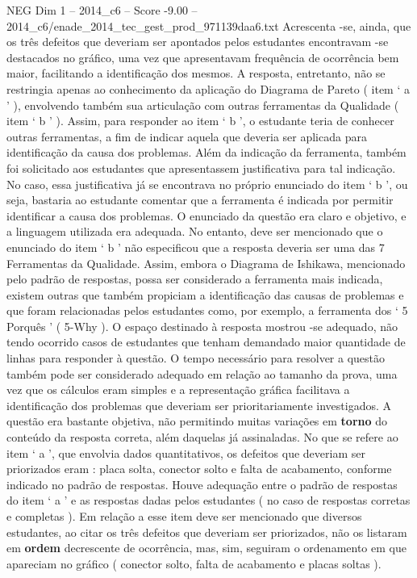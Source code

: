 \begin{textsample}{NEG Dim 1 – 2014\_c6 – Score -9.00 – 2014\_c6/enade\_2014\_tec\_gest\_prod\_971139daa6.txt}
Acrescenta -se, ainda, que os três defeitos que deveriam ser apontados pelos estudantes encontravam -se destacados no gráfico, uma vez que apresentavam frequência de ocorrência bem maior, facilitando a identificação dos mesmos.
A resposta, entretanto, não se restringia apenas ao conhecimento da aplicação do Diagrama de Pareto ( item ‘ a ’ ), envolvendo também sua articulação com outras ferramentas da Qualidade ( item ‘ b ’ ).
Assim, para responder ao item ‘ b ’, o estudante teria de conhecer outras ferramentas, a fim de indicar aquela que deveria ser aplicada para identificação da causa dos problemas.
Além da indicação da ferramenta, também foi solicitado aos estudantes que apresentassem justificativa para tal indicação.
No caso, essa justificativa já se encontrava no próprio enunciado do item ‘ b ’, ou seja, bastaria ao estudante comentar que a ferramenta é indicada por permitir identificar a causa dos problemas.
O enunciado da questão era claro e objetivo, e a linguagem utilizada era adequada.
No entanto, deve ser mencionado que o enunciado do item ‘ b ’ não especificou que a resposta deveria ser uma das 7 Ferramentas da Qualidade.
Assim, embora o Diagrama de Ishikawa, mencionado pelo padrão de respostas, possa ser considerado a ferramenta mais indicada, existem outras que também propiciam a identificação das causas de problemas e que foram relacionadas pelos estudantes como, por exemplo, a ferramenta dos ‘ 5 Porquês ’ ( 5-Why ).
O espaço destinado à resposta mostrou -se adequado, não tendo ocorrido casos de estudantes que tenham demandado maior quantidade de linhas para responder à questão.
O tempo necessário para resolver a questão também pode ser considerado adequado em relação ao tamanho da prova, uma vez que os cálculos eram simples e a representação gráfica facilitava a identificação dos problemas que deveriam ser prioritariamente investigados.
A questão era bastante objetiva, não permitindo muitas variações em \textbf{torno} do conteúdo da resposta correta, além daquelas já assinaladas.
No que se refere ao item ‘ a ’, que envolvia dados quantitativos, os defeitos que deveriam ser priorizados eram : placa solta, conector solto e falta de acabamento, conforme indicado no padrão de respostas.
Houve adequação entre o padrão de respostas do item ‘ a ’ e as respostas dadas pelos estudantes ( no caso de respostas corretas e completas ).
Em relação a esse item deve ser mencionado que diversos estudantes, ao citar os três defeitos que deveriam ser priorizados, não os listaram em \textbf{ordem} decrescente de ocorrência, mas, sim, seguiram o ordenamento em que apareciam no gráfico ( conector solto, falta de acabamento e placas soltas ).

\end{textsample}
